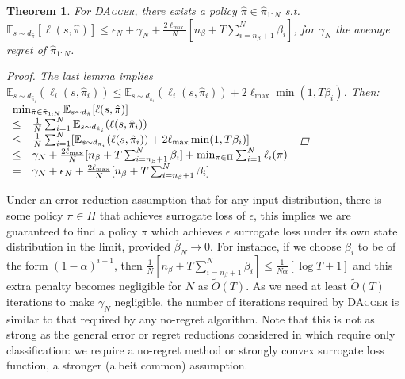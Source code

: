 \documentclass[twoside]{article}
\newtheorem{theorem}{Theorem}[section]
\begin{document}
\begin{theorem}\label{thmDagger2}
For \textsc{DAgger}, there exists a policy $\hat{\pi} \in \hat{\pi}_{1:N}$ s.t. $\mathbb{E}_{s \sim d_{\hat{\pi}}}[ \ell(s,\hat{\pi}) ] \leq \epsilon_N + \gamma_N + \frac{2 \ell_{\max}}{N} [n_\beta + T \sum_{i=n_\beta+1}^N \beta_i]$, for $\gamma_N$ the average regret of $\hat{\pi}_{1:N}$.
\begin{proof}
The last lemma implies $\mathbb{E}_{s \sim d_{\hat{\pi}_i}}(\ell_i(s,\hat{\pi}_i)) \leq \mathbb{E}_{s \sim d_{\pi_i}}(\ell_i(s,\hat{\pi}_i)) + 2 \ell_{\max} \min(1, T \beta_i)$. Then:
$\begin{array}{rl}
\multicolumn{2}{l}{\min_{\hat{\pi} \in \hat{\pi}_{1:N}} \mathbb{E}_{s \sim d_{\hat{\pi}}}[ \ell(s,\hat{\pi}) ]}\\
\leq & \frac{1}{N} \sum_{i=1}^N \mathbb{E}_{s \sim d_{\hat{\pi}_i}}(\ell(s,\hat{\pi}_i))\\
\leq & \frac{1}{N} \sum_{i=1}^N [ \mathbb{E}_{s \sim d_{\pi_i}}(\ell(s,\hat{\pi}_i)) + 2 \ell_{\max} \min(1, T \beta_i) ]\\
\leq & \gamma_N + \frac{2 \ell_{\max}}{N} [n_\beta + T \sum_{i=n_\beta+1}^N \beta_i] + \min_{\pi \in \Pi} \sum_{i=1}^N \ell_i(\pi)\\
= & \gamma_N + \epsilon_N + \frac{2 \ell_{\max}}{N} [n_\beta + T \sum_{i=n_\beta+1}^N \beta_i] \\
\end{array}$
\end{proof}
\end{theorem}
%
Under an error reduction assumption that for any input distribution, there is some policy $\pi \in \Pi$ that achieves surrogate loss of $\epsilon$, this implies we are guaranteed to find a policy $\hat{\pi}$ which achieves $\epsilon$ surrogate loss under its own state distribution in the limit, provided $\overline{\beta}_N \rightarrow 0$. For instance, if we choose $\beta_i$ to be of the form $(1-\alpha)^{i-1}$, then $\frac{1}{N}[n_\beta + T \sum_{i=n_\beta+1}^N \beta_i] \leq \frac{1}{N \alpha}[\log T + 1]$ and this extra penalty becomes negligible for $N$ as $\tilde{O}(T)$. As we need at least $\tilde{O}(T)$ iterations to make $\gamma_N$ negligible, the number of iterations required by \textsc{DAgger} is similar to that required by any no-regret algorithm. Note that this is not as strong as the general error or regret reductions considered in \citep{Beygelzimer05, Ross10, Daume09} which require only classification: we require a no-regret method or strongly convex surrogate loss function, a
stronger (albeit common) assumption. %
\end{document}
